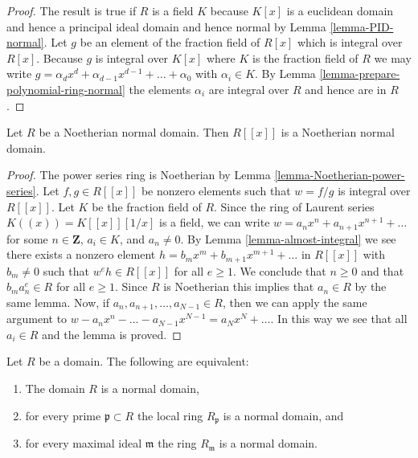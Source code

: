 \begin{proof}
The result is true if $R$ is a field $K$ because
$K[x]$ is a euclidean domain and hence a principal ideal
domain and hence normal by Lemma \ref{lemma-PID-normal}.
Let $g$ be an element of the fraction field of
$R[x]$ which is integral over $R[x]$. Because $g$
is integral over $K[x]$ where $K$ is the fraction
field of $R$ we may write $g = \alpha_d x^d + \alpha_{d-1}x^{d-1} +
\ldots + \alpha_0$ with $\alpha_i \in K$.
By Lemma \ref{lemma-prepare-polynomial-ring-normal}
the elements $\alpha_i$ are integral over $R$ and
hence are in $R$.
\end{proof}

\begin{lemma}
\label{lemma-power-series-over-Noetherian-normal-domain}
Let $R$ be a Noetherian normal domain. Then $R[[x]]$ is
a Noetherian normal domain.
\end{lemma}

\begin{proof}
The power series ring is Noetherian by
Lemma \ref{lemma-Noetherian-power-series}.
Let $f, g \in R[[x]]$ be nonzero elements such that
$w = f/g$ is integral over $R[[x]]$.
Let $K$ be the fraction field of $R$. Since the ring of Laurent series
$K((x)) = K[[x]][1/x]$ is a field, we can write
$w = a_n x^n + a_{n + 1} x^{n + 1} + \ldots$
for some $n \in \mathbf{Z}$, $a_i \in K$, and $a_n \not = 0$.
By Lemma \ref{lemma-almost-integral} we see there exists a
nonzero element $h = b_m x^m + b_{m + 1} x^{m + 1} + \ldots$
in $R[[x]]$ with $b_m \not = 0$ such that
$w^e h \in R[[x]]$ for all $e \geq 1$. We conclude that $n \geq 0$ and that
$b_m a_n^e \in R$ for all $e \geq 1$.
Since $R$ is Noetherian this implies that $a_n \in R$ by
the same lemma. Now, if $a_n, a_{n + 1}, \ldots, a_{N - 1} \in R$,
then we can apply the same argument to
$w - a_n x^n - \ldots - a_{N - 1} x^{N - 1} = a_N x^N + \ldots$.
In this way we see that all $a_i \in R$ and the lemma is proved.
\end{proof}

\begin{lemma}
\label{lemma-normality-is-local}
Let $R$ be a domain. The following are equivalent:
\begin{enumerate}
\item The domain $R$ is a normal domain,
\item for every prime $\mathfrak p \subset R$ the local ring
$R_{\mathfrak p}$ is a normal domain, and
\item for every maximal ideal $\mathfrak m$ the ring $R_{\mathfrak m}$
is a normal domain.
\end{enumerate}
\end{lemma}

